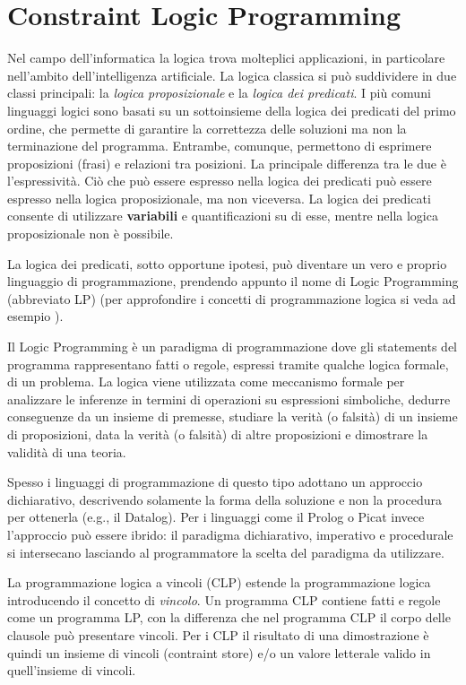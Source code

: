 \documentclass[12pt,a4paper,openright]{book} %
\begin{document}
\section{Constraint Logic Programming}
\label{sec:clpbasedlang_clp}

Nel campo dell'informatica la logica trova molteplici applicazioni, in
particolare nell'ambito dell'intelligenza artificiale. La logica
classica si può suddividere in due classi principali: la \emph{logica
  proposizionale} e la \emph{logica dei predicati}.  I più comuni
linguaggi logici sono basati su un sottoinsieme della logica dei
predicati del primo ordine, che permette di garantire la correttezza
delle soluzioni ma non la terminazione del programma. Entrambe,
comunque, permettono di esprimere proposizioni (frasi) e relazioni tra
posizioni. La principale differenza tra le due è l'espressività. Ciò
che può essere espresso nella logica dei predicati può essere espresso
nella logica proposizionale, ma non viceversa. La logica dei predicati
consente di utilizzare \textbf{variabili} e quantificazioni su di
esse, mentre nella logica proposizionale non è possibile.

La logica dei predicati, sotto opportune ipotesi, può diventare un
vero e proprio linguaggio di programmazione, prendendo appunto il nome
di Logic Programming (abbreviato LP) (per approfondire i concetti di
programmazione logica si veda ad esempio \cite{Console97}).

Il Logic Programming è un paradigma di programmazione dove gli
statements del programma rappresentano fatti o regole, espressi
tramite qualche logica formale, di un problema. La logica viene
utilizzata come meccanismo formale per analizzare le inferenze in
termini di operazioni su espressioni simboliche, dedurre conseguenze
da un insieme di premesse, studiare la verità (o falsità) di un
insieme di proposizioni, data la verità (o falsità) di altre
proposizioni e dimostrare la validità di una teoria.

Spesso i linguaggi di programmazione di questo tipo adottano un
approccio dichiarativo, descrivendo solamente la forma della soluzione
e non la procedura per ottenerla (e.g., il Datalog). Per i linguaggi
come il Prolog o Picat invece l'approccio può essere ibrido: il
paradigma dichiarativo, imperativo e procedurale si intersecano
lasciando al programmatore la scelta del paradigma da utilizzare.

La programmazione logica a vincoli (CLP) estende la programmazione
logica introducendo il concetto di \emph{vincolo}. Un programma CLP
contiene fatti e regole come un programma LP, con la differenza che
nel programma CLP il corpo delle clausole può presentare vincoli. Per
i CLP il risultato di una dimostrazione è quindi un insieme di vincoli
(contraint store) e/o un valore letterale valido in quell'insieme di
vincoli.
\end{document}
